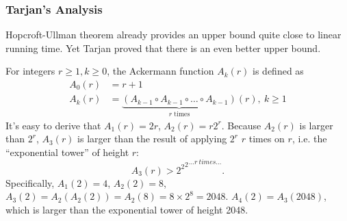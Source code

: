 \subsubsection{Tarjan's Analysis}
Hopcroft-Ullman theorem already provides an upper bound quite close to linear running time. Yet Tarjan proved that there is an even better upper bound. 

For integers $r\geq 1, k\geq 0$, the Ackermann function $A_k(r)$ is defined as 
\begin{align*}
A_0(r)&=r+1\\
A_k(r)&=\underbrace{(A_{k-1}\circ A_{k-1}\circ\dots\circ A_{k-1})}_{r\text{ times}}(r),\:k\geq 1
\end{align*}
It's easy to derive that $A_1(r)=2r$, $A_2(r)=r2^r$. Because $A_2(r)$ is larger than $2^r$, $A_3(r)$ is larger than the result of applying $2^r$ $r$ times on $r$, i.e. the ``exponential tower'' of height $r$:
$$A_3(r)>{{2^2}^2}^{\dots r\:times\dots}.$$
Specifically, $A_1(2)=4$, $A_2(2)=8$, $A_3(2)=A_2(A_2(2))=A_2(8)=8\times 2^8=2048$. $A_4(2)=A_3(2048)$, which is larger than the exponential tower of height 2048. 

